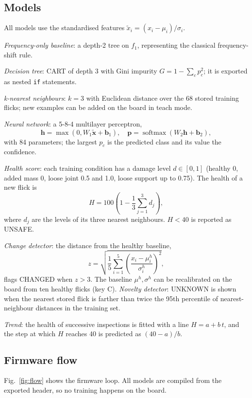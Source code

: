\documentclass[conference]{IEEEtran}
\begin{document}
\subsection{Models}
All models use the standardised features $\tilde{x}_i = (x_i-\mu_i)/\sigma_i$.

\emph{Frequency-only baseline}: a depth-2 tree on $f_1$, representing the classical frequency-shift rule.

\emph{Decision tree}: CART of depth 3 with Gini impurity $G = 1-\sum_c p_c^2$; it is exported as nested \texttt{if} statements.

\emph{k-nearest neighbours}: $k=3$ with Euclidean distance over the 68 stored training flicks; new examples can be added on the board in teach mode.

\emph{Neural network}: a 5-8-4 multilayer perceptron,
\begin{equation}
\mathbf{h} = \max(0, W_1\tilde{\mathbf{x}}+\mathbf{b}_1),\quad \mathbf{p} = \operatorname{softmax}(W_2\mathbf{h}+\mathbf{b}_2),
\end{equation}
with 84 parameters; the largest $p_c$ is the predicted class and its value the confidence.

\emph{Health score}: each training condition has a damage level $d\in[0,1]$ (healthy 0, added mass 0, loose joint 0.5 and 1.0, loose support up to 0.75). The health of a new flick is
\begin{equation}
H = 100\left(1-\frac{1}{3}\sum_{j=1}^{3} d_j\right),
\end{equation}
where $d_j$ are the levels of its three nearest neighbours. $H<40$ is reported as UNSAFE.

\emph{Change detector}: the distance from the healthy baseline,
\begin{equation}
z = \sqrt{\frac{1}{5}\sum_{i=1}^{5}\left(\frac{x_i-\mu_i^{h}}{\sigma_i^{h}}\right)^2},
\end{equation}
flags CHANGED when $z>3$. The baseline $\mu^h,\sigma^h$ can be recalibrated on the board from ten healthy flicks (key C). \emph{Novelty detector}: UNKNOWN is shown when the nearest stored flick is farther than twice the 95th percentile of nearest-neighbour distances in the training set.

\emph{Trend}: the health of successive inspections is fitted with a line $H = a + b\,t$, and the step at which $H$ reaches 40 is predicted as $(40-a)/b$.

\subsection{Firmware flow}
Fig.~\ref{fig:flow} shows the firmware loop. All models are compiled from the exported header, so no training happens on the board.
\end{document}

